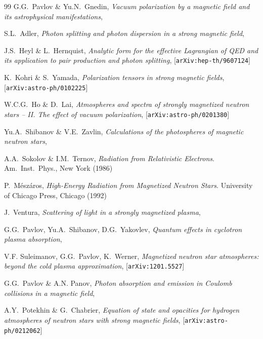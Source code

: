 \documentclass{pos1}
\begin{document}
\begin{thebibliography}{99}
G.G.~Pavlov \& Yu.N.~Gnedin,
\textit{Vacuum polarization by a magnetic field and its astrophysical manifestations},

S.L.~Adler,
\textit{Photon splitting and photon dispersion in a strong magnetic field},

J.S.~Heyl \& L.~Hernquist,
\textit{Analytic form for the effective Lagrangian of QED and its application to pair production and photon splitting},
[\texttt{arXiv:hep-th/9607124}]

K.~Kohri \& S.~Yamada,
\textit{Polarization tensors in strong magnetic fields},
[\texttt{arXiv:astro-ph/0102225}]

W.C.G.~Ho \& D.~Lai,
\textit{Atmospheres and spectra of strongly magnetized neutron stars -- II. The effect of vacuum polarization},
[\texttt{arXiv:astro-ph/0201380}]

Yu.A.~Shibanov \& V.E.~Zavlin,
\textit{Calculations of the photospheres of magnetic neutron stars},

A.A.~Sokolov \& I.M.~Ternov,
\textit{Radiation from Relativistic Electrons}.
Am.\ Inst.\ Phys., New York (1986)

P.~M\'esz\'aros,
\textit{High-Energy Radiation from Magnetized Neutron
Stars}. University of Chicago Press, Chicago (1992)

J.~Ventura,
\textit{Scattering of light in a strongly magnetized plasma},

G.G.~Pavlov, Yu.A.~Shibanov, D.G.~Yakovlev,
\textit{Quantum effects in cyclotron plasma absorption},

V.F. Suleimanov, G.G.~Pavlov, K.~Werner,
\textit{Magnetized neutron star atmospheres: beyond the cold plasma approximation},
[\texttt{arXiv:1201.5527}]

G.G.~Pavlov \& A.N. Panov,
\textit{Photon absorption and emission in Coulomb collisions in a magnetic field},

A.Y.~Potekhin \& G.~Chabrier,
\textit{Equation of state and opacities for hydrogen atmospheres of neutron stars with strong magnetic fields},
[\texttt{arXiv:astro-ph/0212062}]


\end{thebibliography}
\end{document}
